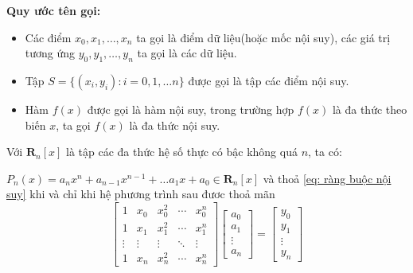 \textbf{Quy ước tên gọi: }
\begin{itemize}
	\item Các điểm $x_0, x_1, \dots, x_n$ ta gọi là điểm dữ liệu(hoặc mốc nội suy), các giá trị tương ứng $y_0, y_1, \dots, y_n$ ta gọi là các dữ liệu.
	\item Tập $S=\{(x_i, y_i): i=0, 1, \dots n \}$ được gọi là tập các điểm nội suy.
	\item  Hàm $f(x)$ được gọi là hàm nội suy, trong trường hợp $f(x)$ là đa thức theo biến $x$, ta gọi $f(x)$ là đa thức nội suy.
\end{itemize}
\begin{menhde}{}{}
Với $\mathbf{R}_n[x]$ là tập các đa thức hệ số thực có bậc không quá $n$, ta có:

$P_n(x)=a_n x^n+ a_{n-1}x^{n-1}+\dots a_1 x+a_0\in \mathbf{R}_n[x]$ và thoả \eqref{eq: ràng buộc nội suy} khi và chỉ khi hệ phương trình sau đươc thoả mãn
\begin{equation}
	\begin{bmatrix}
		1 & x_0 & x_0^2 & \cdots & x_0^n \\
		1 & x_1 & x_1^2 & \cdots & x_1^n \\
		\vdots & \vdots & \vdots & \ddots & \vdots \\
		1 & x_n & x_n^2 & \cdots & x_n^n 
	\end{bmatrix}	
\begin{bmatrix} 
a_0\\ a_1 \\ \vdots \\ a_n
\end{bmatrix}=
\begin{bmatrix}
y_0\\ y_1 \\ \vdots \\ y_n
\end{bmatrix}
\end{equation}
\end{menhde}

